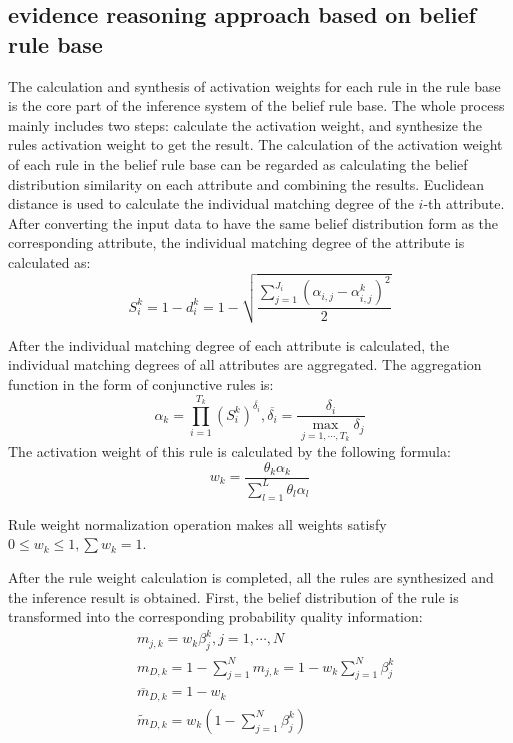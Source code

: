 \documentclass{ieeeaccess}
\begin{document}
\subsection{evidence reasoning approach based on belief rule base}
The calculation and synthesis of activation weights for each rule in the rule base is the core part of the inference system of the belief rule base.
The whole process mainly includes two steps: calculate the activation weight, and synthesize the rules activation weight to get the result.
The calculation of the activation weight of each rule in the belief rule base can be regarded as calculating the belief distribution similarity on each attribute and combining the results.
Euclidean distance is used to calculate the individual matching degree of the $i$-th attribute. After converting the input data to have the same belief distribution form as the corresponding attribute,
the individual matching degree of the attribute is calculated as:
\begin{equation}
    S_i^k=1-d_i^k=1-\sqrt{\frac{\sum_{j=1}^{J_i}(\alpha_{i,j}-\alpha_{i,j}^k)^2}{2}}
\end{equation}

After the individual matching degree of each attribute is calculated, the individual matching degrees of all attributes are aggregated. The aggregation function in the form of conjunctive rules is:
\begin{equation}
    \alpha_k=\prod_{i=1}^{T_k}(S_i^k)^{\overline{\delta_i}},\overline{\delta_i}=\frac{\delta_i}{\max_{j=1,\cdots,T_k}\delta_j}
\end{equation}
The activation weight of this rule is calculated by the following formula:
\begin{equation}
    w_k=\frac{\theta_k\alpha_k}{\sum_{l=1}^L\theta_l\alpha_l}
\end{equation}

Rule weight normalization operation makes all weights satisfy $0\leq w_k\leq 1,\sum w_k=1$.

After the rule weight calculation is completed, all the rules are synthesized and the inference result is obtained.
First, the belief distribution of the rule is transformed into the corresponding probability quality information:
\begin{align}
     & m_{j,k}=w_k\beta_j^k,j=1,\cdots,N                          \\
     & m_{D,k}=1-\sum_{j=1}^Nm_{j,k}=1-w_k\sum_{j=1}^{N}\beta_j^k \\
     & \overline{m}_{D,k}=1-w_k                                   \\
     & \widetilde{m}_{D,k}=w_k(1-\sum_{j=1}^N\beta_j^k)
\end{align}
\end{document}
